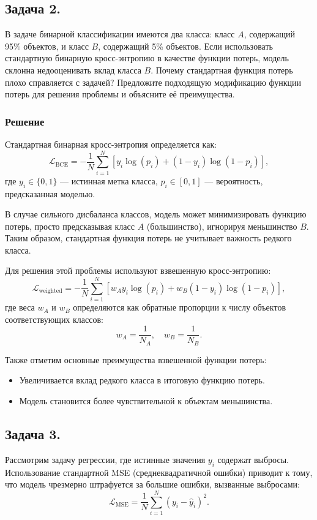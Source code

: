 \subsection*{Задача 2.}

В задаче бинарной классификации имеются два класса: класс $A$, содержащий 95\% объектов, и класс $B$, содержащий 5\% объектов. Если использовать стандартную бинарную кросс-энтропию в качестве функции потерь, модель склонна недооценивать вклад класса $B$. Почему стандартная функция потерь плохо справляется с задачей? Предложите подходящую модификацию функции потерь для решения проблемы и объясните её преимущества.

\subsubsection*{Решение}

Стандартная бинарная кросс-энтропия определяется как:
\[
    \mathcal{L}_{\text{BCE}} = - \frac{1}{N} \sum_{i=1}^N \left[ y_i \log(p_i) + (1-y_i)\log(1-p_i) \right],
\]
где $y_i \in \{0, 1\}$ — истинная метка класса, $p_i \in [0, 1]$ — вероятность, предсказанная моделью.

В случае сильного дисбаланса классов, модель может минимизировать функцию потерь, просто предсказывая класс $A$ (большинство), игнорируя меньшинство $B$. Таким образом, стандартная функция потерь не учитывает важность редкого класса.

Для решения этой проблемы используют взвешенную кросс-энтропию:
\[
    \mathcal{L}_{\text{weighted}} = - \frac{1}{N} \sum_{i=1}^N \left[ w_A y_i \log(p_i) + w_B (1-y_i)\log(1-p_i) \right],
\]
где веса $w_A$ и $w_B$ определяются как обратные пропорции к числу объектов соответствующих классов:
\[
    w_A = \frac{1}{N_A}, \quad w_B = \frac{1}{N_B}.
\]

Также отметим основные преимущества взвешенной функции потерь:
\begin{itemize}
    \item Увеличивается вклад редкого класса в итоговую функцию потерь.
    \item Модель становится более чувствительной к объектам меньшинства.
\end{itemize}

\subsection*{Задача 3.}

Рассмотрим задачу регрессии, где истинные значения $y_i$ содержат выбросы. Использование стандартной MSE (среднеквадратичной ошибки) приводит к тому, что модель чрезмерно штрафуется за большие ошибки, вызванные выбросами:
\[
    \mathcal{L}_{\text{MSE}} = \frac{1}{N} \sum_{i=1}^N (y_i - \hat{y}_i)^2.
\]

